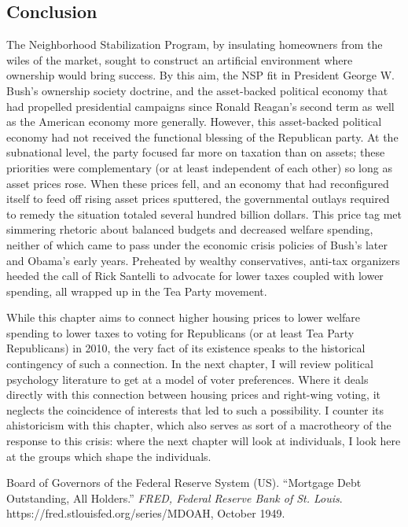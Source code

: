 \documentclass[
]{article}
\begin{document}
\hypertarget{conclusion}{%
\subsection{Conclusion}\label{conclusion}}

The Neighborhood Stabilization Program, by insulating homeowners from
the wiles of the market, sought to construct an artificial environment
where ownership would bring success. By this aim, the NSP fit in
President George W. Bush's ownership society doctrine, and the
asset-backed political economy that had propelled presidential campaigns
since Ronald Reagan's second term as well as the American economy more
generally. However, this asset-backed political economy had not received
the functional blessing of the Republican party. At the subnational
level, the party focused far more on taxation than on assets; these
priorities were complementary (or at least independent of each other) so
long as asset prices rose. When these prices fell, and an economy that
had reconfigured itself to feed off rising asset prices sputtered, the
governmental outlays required to remedy the situation totaled several
hundred billion dollars. This price tag met simmering rhetoric about
balanced budgets and decreased welfare spending, neither of which came
to pass under the economic crisis policies of Bush's later and Obama's
early years. Preheated by wealthy conservatives, anti-tax organizers
heeded the call of Rick Santelli to advocate for lower taxes coupled
with lower spending, all wrapped up in the Tea Party movement.

While this chapter aims to connect higher housing prices to lower
welfare spending to lower taxes to voting for Republicans (or at least
Tea Party Republicans) in 2010, the very fact of its existence speaks to
the historical contingency of such a connection. In the next chapter, I
will review political psychology literature to get at a model of voter
preferences. Where it deals directly with this connection between
housing prices and right-wing voting, it neglects the coincidence of
interests that led to such a possibility. I counter its ahistoricism
with this chapter, which also serves as sort of a macrotheory of the
response to this crisis: where the next chapter will look at
individuals, I look here at the groups which shape the individuals.

\hypertarget{refs}{}
\leavevmode\hypertarget{ref-boardofgovernorsofthefederalreservesystemus1949mortgagec}{}%
Board of Governors of the Federal Reserve System (US). ``Mortgage Debt
Outstanding, All Holders.'' \emph{FRED, Federal Reserve Bank of St.
Louis}. https://fred.stlouisfed.org/series/MDOAH, October 1949.
\end{document}
